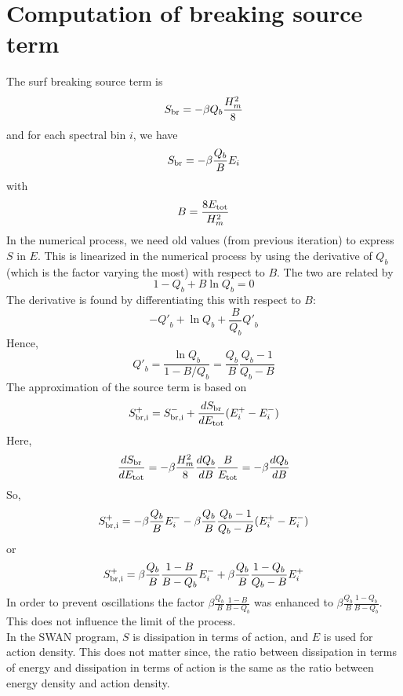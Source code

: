\documentclass[12pt]{book}
\begin{document}
\section{Computation of breaking source term}

The surf breaking source term is
\begin{equation}
  S_{\rm br} = -\beta Q_{b} \frac{H^2_m}{8}
\end{equation}
and for each spectral bin $i$, we have
\begin{equation}
  S_{\rm br} = -\beta \frac{Q_b}{B} E_i
\end{equation}
with
\begin{equation}
  B = \frac{8E_{\rm tot}}{H^2_m}
\end{equation}
In the numerical process, we need old values (from previous iteration) to express $S$ in $E$. This is linearized
in the numerical process by using the derivative of $Q_b$ (which is the factor varying the most) with respect
to $B$. The two are related by
\begin{equation}
  1- Q_b + B \ln Q_b = 0
\end{equation}
The derivative is found by differentiating this with respect to $B$:
\begin{equation}
  -{Q'}_{b} + \ln Q_b + \frac{B}{Q_b} {Q'}_{b}
\end{equation}
Hence,
\begin{equation}
  {Q'}_{b} = \frac{\ln Q_b}{1 - B/Q_b} = \frac{Q_b}{B} \frac{Q_b - 1}{Q_b - B}
\end{equation}
The approximation of the source term is based on
\begin{equation}
  S_{\rm br,i}^{+} = S_{\rm br,i}^{-} + \frac{d S_{\rm br}}{d E_{\rm tot}} (E_{i}^{+} - E_{i}^{-})
\end{equation}
Here,
\begin{equation}
  \frac{d S_{\rm br}}{d E_{\rm tot}} = -\beta \frac{H_m^2}{8} \frac{dQ_b}{dB} \frac{B}{E_{\rm tot}} =
  -\beta \frac{dQ_b}{dB}
\end{equation}
So,
\begin{equation}
  S_{\rm br,i}^{+} =-\beta \frac{Q_b}{B}E_{i}^{-} - \beta \frac{Q_b}{B} \frac{Q_b - 1}{Q_b - B} (E_{i}^{+} - E_{i}^{-})
\end{equation}
or
\begin{equation}
  S_{\rm br,i}^{+} =\beta \frac{Q_b}{B} \frac{1 - B}{B - Q_b} E_{i}^{-} + \beta \frac{Q_b}{B} \frac{1 - Q_b}{Q_b - B} E_{i}^{+}
\end{equation}
In order to prevent oscillations the factor $\beta \frac{Q_b}{B} \frac{1 - B}{B - Q_b}$ was enhanced to
$\beta \frac{Q_b}{B} \frac{1 - Q_b}{B - Q_b}$. This does not influence the limit of the process.
\\[2ex]
In the SWAN program, $S$ is dissipation in terms of action, and $E$ is used for action density. This does not matter since, the ratio
between dissipation in terms of energy and dissipation in terms of action is the same as the ratio between energy density and
action density.
\end{document}
